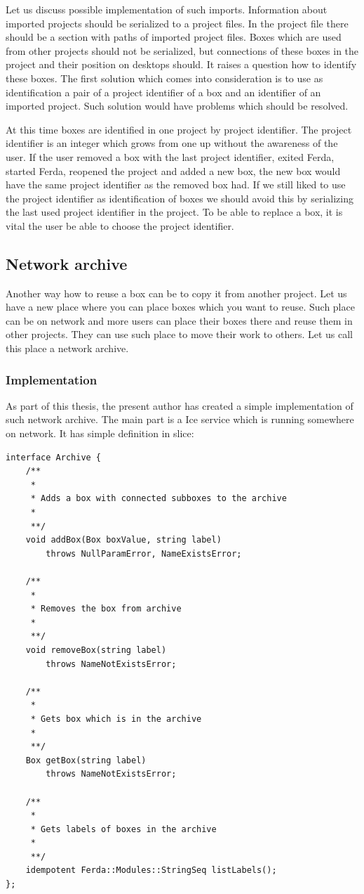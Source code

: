 \documentclass[a4paper,12pt]{book}
\begin{document}
Let us discuss possible implementation of such imports. Information about imported projects should be serialized to a project files. In the project file there should be a section with paths of imported project files. Boxes which are used from other projects should not be serialized, but connections of these boxes in the project and their position on desktops should. It raises a question how to identify these boxes. The first solution which comes into consideration is to use as identification a pair of a project identifier of a box and an identifier of an imported project. Such solution would have problems which should be resolved.

At this time boxes are identified in one project by project identifier. The project identifier is an integer which grows from one up without the awareness of the user. If the user removed a box with the last project identifier, exited Ferda, started Ferda, reopened the project and added a new box, the new box would have the same project identifier as the removed box had. If we still liked to use the project identifier as identification of boxes we should avoid this by serializing the last used project identifier in the project. To be able to replace a box, it is vital the user be able to choose the project identifier.

\subsection{Network archive}
Another way how to reuse a box can be to copy it from another project. Let us have a new place where you can place boxes which you want to reuse. Such place can be on network and more users can place their boxes there and reuse them in other projects. They can use such place to move their work to others. Let us call this place a network archive.

\subsubsection{Implementation}
As part of this thesis, the present author has created a simple implementation of such network archive. The main part is a Ice service which is running somewhere on network. It has simple definition in slice:
\begin{verbatim}
interface Archive {
	/**
	 *
	 * Adds a box with connected subboxes to the archive
	 *
	 **/
	void addBox(Box boxValue, string label)
		throws NullParamError, NameExistsError;

	/**
	 *
	 * Removes the box from archive
	 *
	 **/
	void removeBox(string label)
		throws NameNotExistsError;

	/**
	 *
	 * Gets box which is in the archive
	 *
	 **/
	Box getBox(string label)
		throws NameNotExistsError;

	/**
	 *
	 * Gets labels of boxes in the archive
	 *
	 **/
	idempotent Ferda::Modules::StringSeq listLabels();
};
\end{verbatim}
\end{document}
